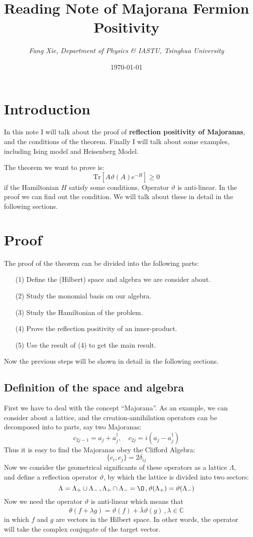 \documentclass{article}
\author{\emph{Fang Xie, Department of Physics \& IASTU, Tsinghua University}}
\title{{\bf{Reading Note of Majorana Fermion Positivity}}}
\date{\today}
\newcommand{\Tr}{\mathrm{Tr}}
\begin{document}
\maketitle
\section{Introduction}
In this note I will talk about the proof of {\bf{reflection positivity of Majoranas}}, and the conditions of the theorem. Finally I will talk about some examples, including Ising model and Heisenberg Model.

The theorem we want to prove is:
$$
\Tr{\left[A\vartheta(A)e^{-H}\right]}\geq 0
$$
if the Hamiltonian $H$ satisfy some conditions. Operator $\vartheta$ is anti-linear. In the proof we can find out the condition. We will talk about these in detail in the following sections.
\section{Proof}
The proof of the theorem can be divided into the following parts:
\begin{enumerate}
\item[(1)] Define the (Hilbert) space and algebra we are consider about.
\item[(2)] Study the monomial basis on our algebra.
\item[(3)] Study the Hamiltonian of the problem.
\item[(4)] Prove the reflection positivity of an inner-product.
\item[(5)] Use the result of (4) to get the main result.
\end{enumerate}
Now the previous steps will be shown in detail in the following sections.
\subsection{Definition of the space and algebra}
First we have to deal with the concept ``Majorana''. As an example, we can consider about a lattice, and the creation-annihilation operators can be decomposed into to parts, say two Majoranas:
$$
c_{2j-1} = a_j + a^\dagger_j,\quad c_{2j} = i(a_j-a^\dagger_j)
$$
Thus it is easy to find the Majoranas obey the Clifford Algebra:
\begin{equation}
\{c_i,c_j\} = 2\delta_{ij}
\end{equation}
Now we consider the geometrical significants of these operators as a lattice $\Lambda$, and define a reflection operator $\vartheta$, by which the lattice is divided into two sectors:
$$
\Lambda = \Lambda_+\cup\Lambda_-\,,\Lambda_+\cap \Lambda_- = \O\,,\vartheta(\Lambda_+) = \vartheta(\Lambda_-)
$$
Now we need the operator $\vartheta$ is anti-linear which means that
$$
\theta(f+ \lambda g) = \vartheta(f) + \bar{\lambda}\vartheta(g)\,,\lambda \in \mathbb{C}
$$
in which $f$ and $g$ are vectors in the Hilbert space. In other words, the operator will take the complex conjugate of the target vector.
\end{document}
